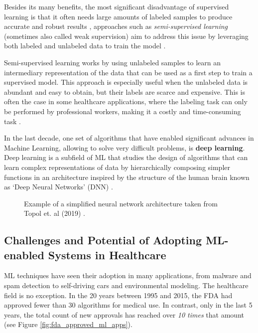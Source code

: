 \documentclass[../main.tex]{subfiles}
\begin{document}
    Besides its many benefits, the most significant disadvantage of supervised learning is that it often needs large amounts of labeled samples to produce accurate and robust results \cite{lecun_deep_2015}, 
    approaches such as \textit{semi-supervised learning} (sometimes also called weak supervision) aim to address this issue by leveraging both labeled and unlabeled data to train the model \cite{zhu_semi-supervised_2008}. 
    
    Semi-supervised learning works by using unlabeled samples to learn an intermediary representation of the data that can be used as a first step to train a supervised model. This approach is especially useful when the unlabeled data is abundant and easy to obtain, but their labels are scarce and expensive. This is often the case in some healthcare applications, where the labeling task can only be performed by professional workers, making it a costly and time-consuming task \cite{yakimovich_labels_2021,chen_study_2015, figueroa_predicting_2012}.
    
    
    In the last decade, one set of algorithms that have enabled significant advances in Machine Learning, allowing to solve very difficult problems, is \textbf{deep learning}. Deep learning is a subfield of ML that studies the design of algorithms that can learn complex representations of data by hierarchically composing simpler functions in an architecture inspired by the structure of the human brain known as `Deep Neural Networks' (DNN)  \cite{lecun_deep_2015}.
    
    \begin{figure}[H]
        \centering
        \caption{Example of a simplified neural network architecture taken from Topol et. al (2019) \cite{topol_high-performance_2019}.}
        \label{fig:dnn_example}
    \end{figure}

    \subsection{Challenges and Potential of Adopting ML-enabled Systems in Healthcare}

    ML techniques have seen their adoption in many applications, from malware and spam detection to self-driving cars and environmental modeling. The healthcare field is no exception. In the 20 years between 1995 and 2015, the FDA had approved fewer than 30 algorithms for medical use. In contrast, only in the last 5 years, the total count of new approvals has reached over \textit{10 times} that amount (see Figure \ref{fig:fda_approved_ml_apps}). 
\end{document}
